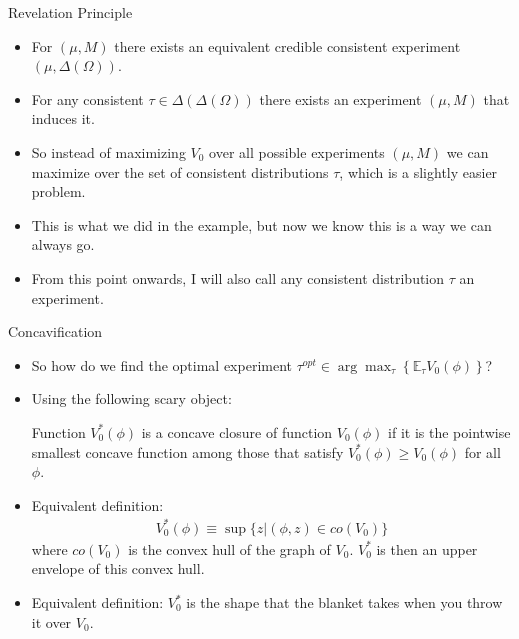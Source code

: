 \documentclass[english,10pt
,aspectratio=169
]{beamer}
\begin{document}
\begin{frame}{Revelation Principle}
\begin{theorem}
	\begin{itemize}
		\item For  $(\mu,M)$ there exists an equivalent \alert{credible consistent} experiment $(\mu,\varDelta(\Omega))$.
		
		\item For any consistent  $\tau \in \varDelta(\varDelta(\Omega))$ there exists \alert{an experiment} $(\mu,M)$ that induces it.
	\end{itemize}
\end{theorem}
\begin{itemize}
	\item So instead of maximizing $V_0$ over all possible experiments $(\mu,M)$ we can maximize over the set of consistent distributions $\tau$, which is a slightly easier problem.
	\item This is what we did in the example, but now we know this is a way we can always go.
	\item From this point onwards, I will also call any consistent distribution $\tau$ an experiment.
\end{itemize}
\end{frame}


\begin{frame}{Concavification}
\begin{itemize}
	\item So how do we find the optimal experiment $\tau^{opt} \in \arg \max_{\tau} \left\{\mathbb{E}_\tau V_0(\phi) \right\}$?
	\pause
	\item Using the following scary object:
	\begin{definition}
		Function $V_0^*(\phi)$ is a \alert{concave closure} of function $V_0(\phi)$ if it is the pointwise smallest concave function among those that satisfy $V_0^*(\phi) \geq V_0(\phi)$ for all $\phi$.
	\end{definition}
	\item Equivalent definition:
	\begin{align*}
		V_0^*(\phi) \equiv \sup \{ z | (\phi,z) \in co(V_0) \}
	\end{align*}
	where $co(V_0)$ is the convex hull of the graph of $V_0$. $V^*_0$ is then an upper envelope of this convex hull.
	\item Equivalent definition: $V_0^*$ is the shape that the blanket takes when you throw it over $V_0$.
\end{itemize}
\end{frame}
\end{document}
